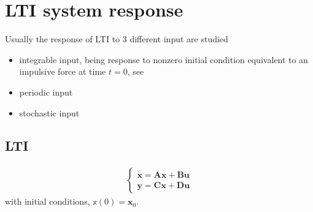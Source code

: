 \documentclass[letterpaper,10pt,english]{jupyterBook}
\begin{document}
\sphinxstepscope


\chapter{LTI system response}
\label{\detokenize{ch/system-theory/lti-response:lti-system-response}}\label{\detokenize{ch/system-theory/lti-response:ode-lti-response}}\label{\detokenize{ch/system-theory/lti-response::doc}}
\sphinxAtStartPar
Usually the response of LTI to 3 different input are studied
\begin{itemize}
\item {} 
\sphinxAtStartPar
integrable input, being response to non\sphinxhyphen{}zero initial condition equivalent to an impulsive force at time \(t = 0\), see {\hyperref[\detokenize{ch/system-theory/lti:ode-lti-impulsive-force}]{}}

\item {} 
\sphinxAtStartPar
periodic input

\item {} 
\sphinxAtStartPar
stochastic input

\end{itemize}


\section{LTI}
\label{\detokenize{ch/system-theory/lti-response:lti}}\begin{equation*}
\begin{split}\begin{cases}
  \dot{\mathbf{x}} = \mathbf{A} \mathbf{x} + \mathbf{B} \mathbf{u} \\
  \mathbf{y} = \mathbf{C} \mathbf{x} + \mathbf{D} \mathbf{u}
\end{cases}\end{split}
\end{equation*}
\sphinxAtStartPar
with initial conditions, \(\mathbb{x}(0) = \mathbf{x}_0\).
\end{document}
